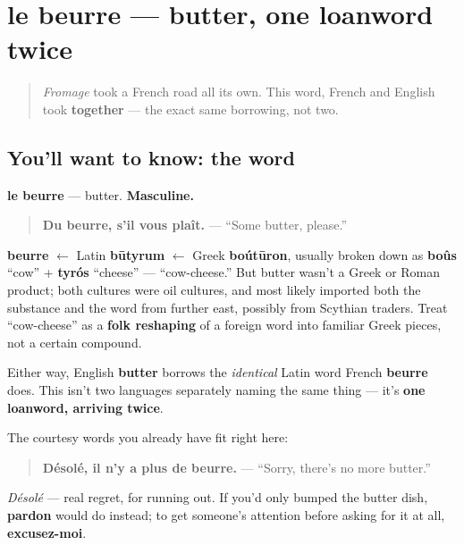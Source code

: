 \section[le beurre]{le beurre — butter, one loanword twice}

\label{lesson:FR-C30-beurre}



\begin{quote}
\emph{Fromage} took a French road all its own. This word, French and English took \textbf{together} — the exact same borrowing, not two.
\end{quote}

\subsection*{You'll want to know: the word}
\textbf{le beurre} — butter. \textbf{Masculine.}

\begin{quote}
\textbf{Du beurre, s'il vous plaît.} — \textquotedblleft{}Some butter, please.\textquotedblright{}
\end{quote}

\begin{cousinweb}
\textbf{beurre} $\leftarrow$ Latin \textbf{būtyrum} $\leftarrow$ Greek \textbf{boútūron}, usually broken down as \textbf{boûs} \textquotedblleft{}cow\textquotedblright{} + \textbf{tyrós} \textquotedblleft{}cheese\textquotedblright{} — \textquotedblleft{}cow-cheese.\textquotedblright{} But butter wasn't a Greek or Roman product; both cultures were oil cultures, and most likely imported both the substance and the word from further east, possibly from Scythian traders. Treat \textquotedblleft{}cow-cheese\textquotedblright{} as a \textbf{folk reshaping} of a foreign word into familiar Greek pieces, not a certain compound.

Either way, English \textbf{butter} borrows the \emph{identical} Latin word French \textbf{beurre} does. This isn't two languages separately naming the same thing — it's \textbf{one loanword, arriving twice}.
\end{cousinweb}

\begin{culture}
The courtesy words you already have fit right here:

\begin{quote}
\textbf{Désolé, il n'y a plus de beurre.} — \textquotedblleft{}Sorry, there's no more butter.\textquotedblright{}
\end{quote}

\emph{Désolé} — real regret, for running out. If you'd only bumped the butter dish, \textbf{pardon} would do instead; to get someone's attention before asking for it at all, \textbf{excusez-moi}.
\end{culture}

